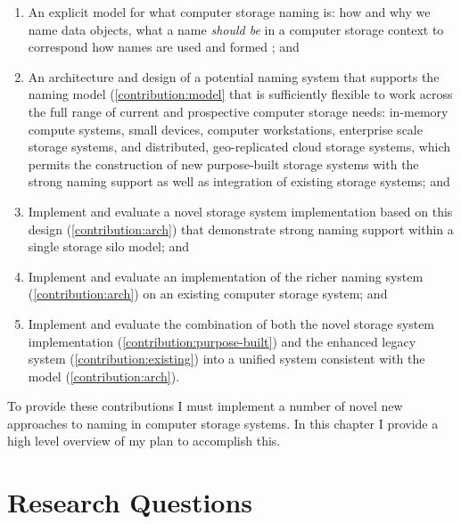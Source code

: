 \begin{enumerate}
    \item \label{contribution:model} An explicit model for what computer storage
          naming is: how and why we name data objects, what a name \emph{should be} in a
          computer storage context to correspond how names are used and formed ;
          and
    \item \label{contribution:arch} An architecture and design of a potential
          naming system that supports the naming model (\autoref{contribution:model}
          that is sufficiently flexible to work across the full range of current and
          prospective computer storage needs: in-memory compute systems, small
          devices, computer workstations, enterprise scale storage systems, and
          distributed, geo-replicated cloud storage systems, which permits the
          construction of new purpose-built storage systems with the strong naming
          support as well
          as integration of existing storage systems; and
    \item \label{contribution:purpose-built} Implement and evaluate a novel
          storage system implementation based on this design (\autoref{contribution:arch}) that
          demonstrate strong naming support within a single storage silo model; and
    \item \label{contribution:existing} Implement and evaluate an implementation
          of the richer naming system (\autoref{contribution:arch}) on an existing
          computer storage system; and
    \item \label{contribution:combined-system}  Implement and evaluate the
          combination of both the novel storage system implementation
          (\autoref{contribution:purpose-built}) and the enhanced legacy system
          (\autoref{contribution:existing}) into a unified system consistent with the
          model (\autoref{contribution:arch}).

\end{enumerate}

To provide these contributions I must implement a number of novel new
approaches to naming in computer storage systems.  In this chapter I provide a
high level overview of my plan to accomplish this.

\section{Research Questions}
\label{ch:plan:sec:research-questions}

